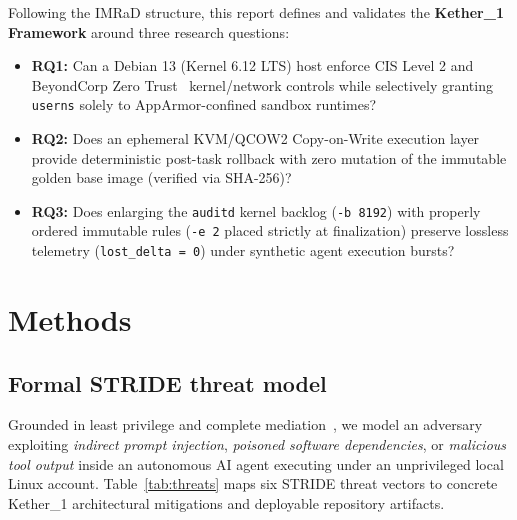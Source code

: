 \documentclass[11pt,a4paper]{article}
\newcommand{\code}[1]{\nolinkurl{#1}}
\begin{document}
Following the IMRaD structure, this report defines and validates the \textbf{Kether\_1 Framework} around three research questions:
\begin{itemize}[leftmargin=1.5em, itemsep=2pt]
  \item \textbf{RQ1:} Can a Debian 13 (Kernel 6.12 LTS) host enforce CIS Level 2 and BeyondCorp Zero Trust~\cite{ward2014beyondcorp,nist800207} kernel/network controls while selectively granting \code{userns} solely to AppArmor-confined sandbox runtimes?
  \item \textbf{RQ2:} Does an ephemeral KVM/QCOW2 Copy-on-Write execution layer provide deterministic post-task rollback with zero mutation of the immutable golden base image (verified via SHA-256)?
  \item \textbf{RQ3:} Does enlarging the \code{auditd} kernel backlog (\code{-b 8192}) with properly ordered immutable rules (\code{-e 2} placed strictly at finalization) preserve lossless telemetry (\code{lost_delta = 0}) under synthetic agent execution bursts?
\end{itemize}

\section{Methods}

\subsection{Formal STRIDE threat model}

Grounded in least privilege and complete mediation~\cite{saltzer1975protection}, we model an adversary exploiting \emph{indirect prompt injection}, \emph{poisoned software dependencies}, or \emph{malicious tool output} inside an autonomous AI agent executing under an unprivileged local Linux account. Table~\ref{tab:threats} maps six STRIDE threat vectors to concrete Kether\_1 architectural mitigations and deployable repository artifacts.
\end{document}
